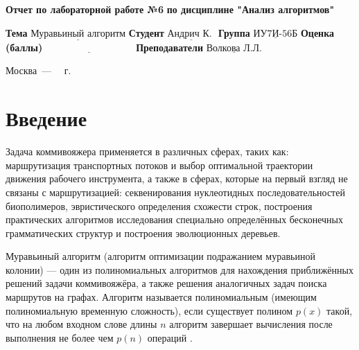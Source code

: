 \documentclass[12pt]{report}
\begin{document}
\begin{titlepage}
	
	\begin{center}
		\noindent\begin{minipage}{1.3\textwidth}\centering
			\Large\textbf{  Отчет по лабораторной работе №6}\newline
			\textbf{по дисциплине "Анализ алгоритмов"}\newline\newline
		\end{minipage}
	\end{center}
	
	\noindent\textbf{Тема} $\underline{\text{Муравьиный алгоритм}}$\newline\newline
	\noindent\textbf{Студент} $\underline{\text{Андрич К. }}$\newline\newline
	\noindent\textbf{Группа} $\underline{\text{ИУ7И-56Б}}$\newline\newline
	\noindent\textbf{Оценка (баллы)} $\underline{\text{~~~~~~~~~~~~~~~~~~~~~~~~~~~}}$\newline\newline
	\noindent\textbf{Преподаватели} $\underline{\text{Волкова Л.Л.}}$\newline\newline\newline
	
	\begin{center}
		\vfill
		Москва~---~\the\year
		~г.
	\end{center}
\end{titlepage}


\tableofcontents

\newpage
\chapter*{Введение}
Задача коммивояжера применяется в различных сферах, таких как: маршрутизация транспортных
потоков и выбор оптимальной траектории движения рабочего инструмента, а
также в сферах, которые на первый взгляд не связаны с маршрутизацией:
секвенирования нуклеотидных последовательностей биополимеров,
эвристического определения схожести строк, построения практических
алгоритмов исследования специально определённых бесконечных
грамматических структур и построения эволюционных деревьев.
\newline

Муравьиный алгоритм (алгоритм оптимизации подражанием муравьиной колонии) — один из полиномиальных алгоритмов для нахождения приближённых решений задачи коммивояжёра, а также решения аналогичных задач поиска маршрутов на графах. Алгоритм называется полиномиальным (имеющим полиномиальную временную сложность), если существует полином $p(x)$ такой, что на любом входном слове длины $n$ алгоритм завершает вычисления после выполнения не более чем $p(n)$ операций .
\newline
\end{document}
